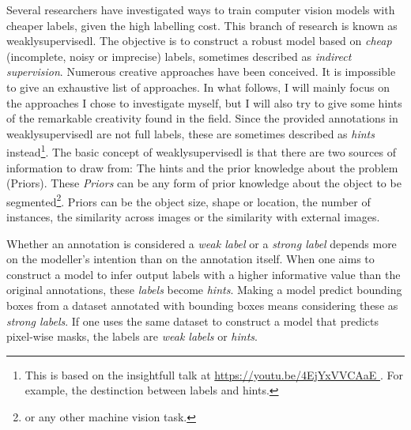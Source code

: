 Several researchers have investigated ways to train computer vision models with cheaper labels, given the high labelling cost.
This branch of research is known as \Gls{weaklysupervisedl}.
The objective is to construct a robust model based on \textit{cheap} (incomplete, noisy or imprecise) labels, sometimes described as \textit{indirect supervision}.
Numerous creative approaches have been conceived. 
It is impossible to give an exhaustive list of approaches. 
In what follows, I will mainly focus on the approaches I chose to investigate myself, but I will also try to give some hints of the remarkable creativity found in the field.
Since the provided annotations in \Gls{weaklysupervisedl} are not full labels, these are sometimes described as \textit{hints} instead\footnote{
    This is based on the insightfull talk at \url{ 
        https://youtu.be/4EjYxVVCAaE
    }. For example, the destinction between labels and hints.
}.
The basic concept of \Gls{weaklysupervisedl} is that there are two sources of information to draw from: The hints and the prior knowledge about the problem (Priors).
These \textit{Priors} can be any form of prior knowledge about the object to be segmented\footnote{or any other machine vision task.}.
Priors can be the object size, shape or location, the number of instances, the similarity across images or the similarity with external images.

Whether an annotation is considered a \textit{weak label} or a \textit{strong label} depends more on the modeller's intention than on the annotation itself. 
When one aims to construct a model to infer output labels with a higher informative value than the original annotations, these \textit{labels} become \textit{hints}.
Making a model predict bounding boxes from a dataset annotated with bounding boxes means considering these as \textit{strong labels}. 
If one uses the same dataset to construct a model that predicts pixel-wise masks, the labels are \textit{weak labels} or \textit{hints}.

